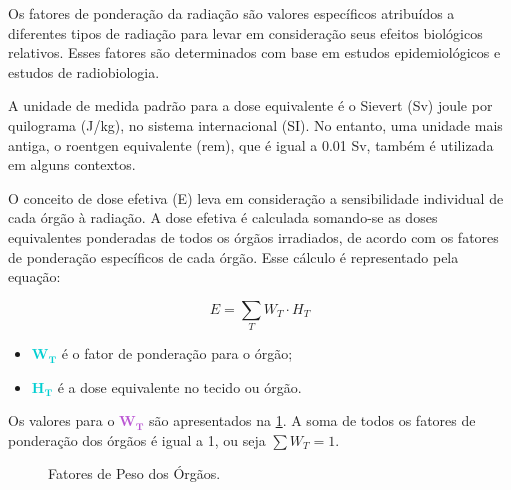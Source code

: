 \documentclass[11pt,a4paper]{article}
\newcounter{exemplo}
\begin{document}
	Os fatores de ponderação da radiação são valores específicos atribuídos a diferentes tipos de radiação para levar em consideração seus efeitos biológicos relativos. Esses fatores são determinados com base em estudos epidemiológicos e estudos de radiobiologia.

	A unidade de medida padrão para a dose equivalente é o Sievert (Sv) joule por 
	quilograma (J/kg), no sistema internacional (SI). No entanto, uma unidade mais antiga, o roentgen equivalente (rem), que é igual a 0.01 Sv, também é utilizada em alguns contextos.
	
	O conceito de dose efetiva (E) leva em consideração a sensibilidade individual de cada órgão à radiação. A dose efetiva é calculada somando-se as doses equivalentes ponderadas de todos os órgãos irradiados, de acordo com os fatores de ponderação específicos de cada órgão. Esse cálculo é representado pela equação:

		\begin{equation}
			E = \sum_T W_T \cdot H_T
		\end{equation}

		\begin{exemplo}[onde,]
			\begin{itemize}
				\item \textcolor{DarkTurquoise}{$\mathbf{W_T}$} é o fator de ponderação para o órgão;
				\item \textcolor{DarkTurquoise}{$\mathbf{H_T}$} é a dose equivalente no tecido ou órgão.
			\end{itemize}
		\end{exemplo}

	Os valores para o \textcolor{MediumOrchid}{$\mathbf{W_T}$} são apresentados na \ref{fig:prFatorPesoOrgao}. A soma de todos os fatores de ponderação dos órgãos é igual a 1, ou seja $\sum W_T = 1$.

	\begin{figure}[!h]
			\centering
			\caption{Fatores de Peso dos Órgãos.}
			\label{fig:prFatorPesoOrgao}
	\end{figure}
\end{document}
